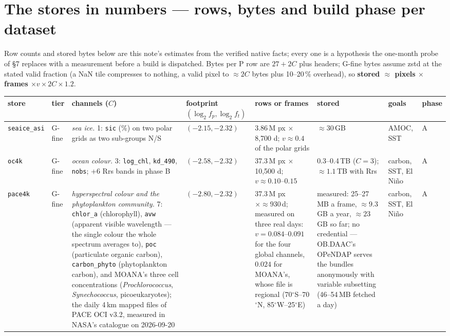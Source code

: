 \documentclass[10pt]{article}
\newcommand{\code}[1]{\texttt{#1}}
\begin{document}
\section{The stores in numbers --- rows, bytes and build phase per dataset}

Row counts and stored bytes below are this note's estimates from the verified
native facts; every one is a hypothesis the one-month probe of \S7 replaces
with a measurement before a build is dispatched. Bytes per P row are
$27 + 2C$ plus headers; G-fine bytes assume zstd at the stated valid fraction
(a NaN tile compresses to nothing, a valid pixel to $\approx 2C$ bytes plus
10--20\,\% overhead), so \textbf{stored $\approx$ pixels $\times$ frames
$\times v \times 2C \times 1.2$}.

\begin{table}[p]
\centering\setlength{\tabcolsep}{2pt}\scriptsize
\begin{tabular}{@{}L{1.55cm}L{0.85cm}L{3.5cm}L{1.9cm}L{2.2cm}L{1.9cm}L{1.7cm}L{0.6cm}@{}}
\toprule
store & tier & channels ($C$) & footprint $(\log_2 f_p, \log_2 f_t)$ & rows or frames & stored & goals & phase \\
\midrule
\code{seaice\_asi} & G-fine & \emph{sea ice.} 1: \code{sic} (\%) on two polar grids as two sub-groups N/S & $(-2.15, -2.32)$ & $3.86$\,M px $\times$ 8,700 d; $v \approx 0.4$ of the polar grids & $\approx 30$\,GB & AMOC, SST & A \\
\code{oc4k} & G-fine & \emph{ocean colour.} 3: \code{log\_chl}, \code{kd\_490}, \code{nobs}; +6 Rrs bands in phase B & $(-2.58, -2.32)$ & 37.3\,M px $\times$ 10,500 d; $v \approx 0.10$--$0.15$ & 0.3--0.4\,TB ($C = 3$); $\approx 1.1$\,TB with Rrs & carbon, SST, El Ni\~no & A \\
\code{pace4k} & G-fine & \emph{hyperspectral colour and the phytoplankton community.} 7: \code{chlor\_a} (chlorophyll), \code{avw} (apparent visible wavelength --- the single colour the whole spectrum averages to), \code{poc} (particulate organic carbon), \code{carbon\_phyto} (phytoplankton carbon), and MOANA's three cell concentrations (\emph{Prochlorococcus}, \emph{Synechococcus}, picoeukaryotes); the daily 4\,km mapped files of PACE OCI v3.2, measured in NASA's catalogue on 2026-09-20 & $(-2.80, -2.32)$ & 37.3\,M px $\times \approx 930$\,d; measured on three real days: $v = 0.084$--$0.091$ for the four global channels, $0.024$ for MOANA's, whose file is regional (70$^\circ$S--70$^\circ$N, 85$^\circ$W--25$^\circ$E) & measured: 25--27\,MB a frame, $\approx 9.3$\,GB a year, $\approx 23$\,GB so far; no credential --- OB.DAAC's OPeNDAP serves the bundles anonymously with variable subsetting (46--54\,MB fetched a day) & carbon, SST, El Ni\~no & A \\

\end{tabular}
\end{table}
\end{document}
